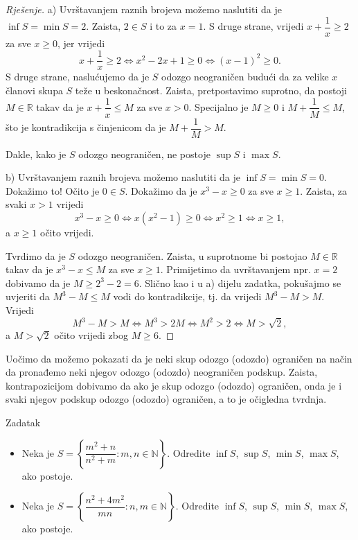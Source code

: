 \begin{proof}[Rješenje]
a) Uvrštavanjem raznih brojeva možemo naslutiti da je $\inf{S}=\min{S}=2$. Zaista, $2\in S$ i to za $x=1$. S druge strane, vrijedi $x+\dfrac{1}{x}\geq 2$ za sve $x\geq 0$, jer vrijedi
$$x+\dfrac{1}{x}\geq 2\Leftrightarrow x^2-2x+1\geq 0\Leftrightarrow (x-1)^2\geq 0.$$
S druge strane, naslućujemo da je $S$ odozgo neograničen budući da za velike $x$ članovi skupa $S$ teže u beskonačnost. Zaista, pretpostavimo suprotno, da postoji $M\in \mathbb{R}$ takav da je $x+\dfrac{1}{x}\leq M$ za sve $x>0$. Specijalno je $M\geq 0$ i $M+\dfrac{1}{M}\leq M$, što je kontradikcija s činjenicom da je $M+\dfrac{1}{M}>M$.


Dakle, kako je $S$ odozgo neograničen, ne postoje $\sup{S}$ i $\max{S}$.

b) Uvrštavanjem raznih brojeva možemo naslutiti da je \(\inf{S}=\min{S}=0\). Dokažimo to! Očito je \(0\in S\). Dokažimo da je \(x^3-x\geq 0\) za sve \(x\geq 1\). Zaista, za svaki $x>1$ vrijedi
\[x^3-x\geq 0\Leftrightarrow x(x^2-1)\geq 0 \Leftrightarrow x^2\geq 1\Leftrightarrow x\geq 1,\]
a $x\geq 1$ očito vrijedi.

Tvrdimo da je $S$ odozgo neograničen. Zaista, u suprotnome bi postojao $M\in \mathbb{R}$ takav da je $x^3-x\leq M$ za sve $x\geq 1$. Primijetimo da uvrštavanjem npr. $x=2$ dobivamo da je $M\geq 2^3-2=6$. Slično kao i u a) dijelu zadatka, pokušajmo se uvjeriti da $M^3-M\leq M$ vodi do kontradikcije, tj. da vrijedi $M^3-M>M$. Vrijedi
$$M^3-M>M\Leftrightarrow M^3>2M\Leftrightarrow M^2>2\Leftrightarrow M>\sqrt{2},$$
a $M>\sqrt{2}$ očito vrijedi zbog $M\geq 6$.
\end{proof}
Uočimo da možemo pokazati da je neki skup odozgo (odozdo) ograničen na način da pronađemo neki njegov odozgo (odozdo) neograničen podskup. Zaista, kontrapozicijom dobivamo da ako je skup odozgo (odozdo) ograničen, onda je i svaki njegov podskup odozgo (odozdo) ograničen, a to je očigledna tvrdnja.
\begin{exercise}{Zadatak} \textbf{}
\label{pluginvalues}
\begin{itemize}
\item[a)] Neka je $S=\left\{\dfrac{m^2+n}{n^2+m} : m, n\in \mathbb{N}\right\}$. Odredite $\inf{S}$, $\sup{S}$, $\min{S}$, $\max{S}$, ako postoje.
\item[b)] Neka je \(S=\left\{\dfrac{n^2+4m^2}{mn} : n, m\in \mathbb{N}\right\}\). Odredite $\inf{S}$, $\sup{S}$, $\min{S}$, $\max{S}$, ako postoje.
\end{itemize}
\end{exercise}
